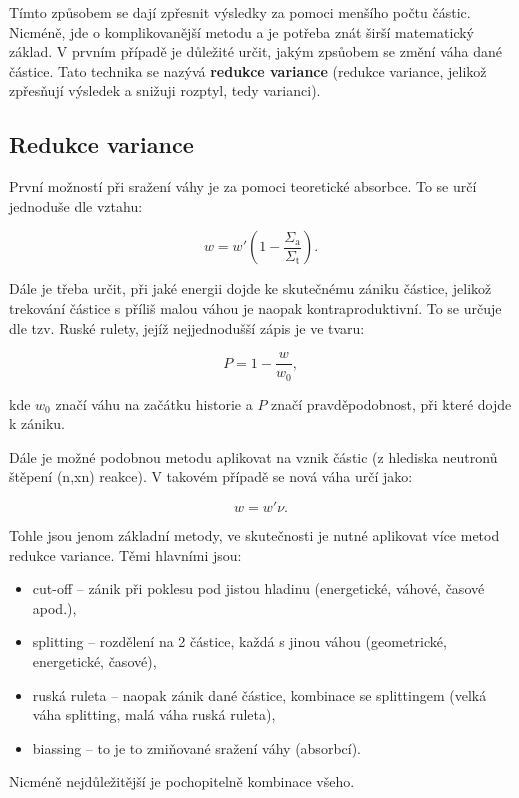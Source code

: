 Tímto způsobem se dají zpřesnit výsledky za pomoci menšího počtu částic. Nicméně, jde o komplikovanější metodu a je potřeba znát širší matematický základ. V prvním případě je důležité určit, jakým zpsůobem se změní váha dané částice. Tato technika se nazývá \textbf{redukce variance} (redukce variance, jelikož zpřesňují výsledek a snižuji rozptyl, tedy varianci).

\subsection{Redukce variance}

První možností při sražení váhy je za pomoci teoretické absorbce. To se určí jednoduše dle vztahu:

$$ w = w' \left ( 1-\dfrac{\Sigma_\text{a}}{\Sigma_\text{t}} \right ). $$

Dále je třeba určit, při jaké energii dojde ke skutečnému zániku částice, jelikož trekování částice s příliš malou váhou je naopak kontraproduktivní. To se určuje dle tzv. Ruské rulety, jejíž nejjednodušší zápis je ve tvaru:

$$ P = 1-\dfrac{w}{w_0}, $$

kde $w_0$ značí váhu na začátku historie a $P$ značí pravděpodobnost, při které dojde k zániku.

Dále je možné podobnou metodu aplikovat na vznik částic (z hlediska neutronů štěpení (n,xn) reakce). V takovém případě se nová váha určí jako:

$$ w = w' \nu. $$

Tohle jsou jenom základní metody, ve skutečnosti je nutné aplikovat více metod redukce variance. Těmi hlavními jsou:

\begin{itemize}
  \item cut-off -- zánik při poklesu pod jistou hladinu (energetické, váhové, časové apod.),
  \item splitting -- rozdělení na 2 částice, každá s jinou váhou (geometrické, energetické, časové),
  \item ruská ruleta -- naopak zánik dané částice, kombinace se splittingem (velká váha splitting, malá váha ruská ruleta),
  \item biassing -- to je to zmiňované sražení váhy (absorbcí).
\end{itemize}

Nicméně nejdůležitější je pochopitelně kombinace všeho.
